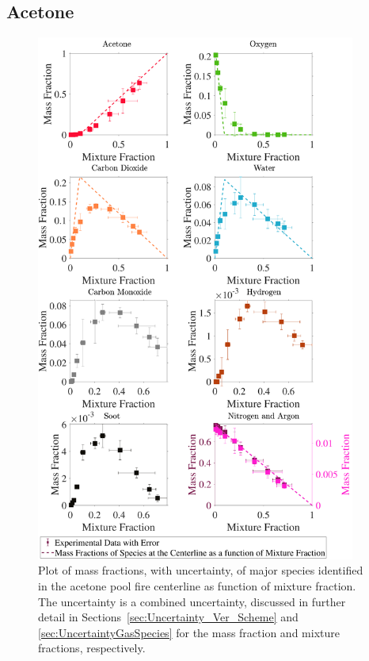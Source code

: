 \documentclass[12pt]{article}
\begin{document}
\subsection{Acetone}
\label{ssec:Acetone_ALL_Mix_Frac}
\begin{figure}[!h]
	\centering
\includegraphics[width=10.5cm,keepaspectratio]{Acetone_Mixture_Fraction_Major_Plot.pdf}
	\caption[Species mass fractions superimposed on acetone state relations]{Plot of mass fractions, with uncertainty, of major species identified in the acetone pool fire centerline as function of mixture fraction. The uncertainty is a combined uncertainty, discussed in further detail in Sections~\ref{sec:Uncertainty_Ver_Scheme} and \ref{sec:UncertaintyGasSpecies} for the mass fraction and mixture fractions, respectively.}
	\label{fig:Acetone_MIX_Frac_Major}
\end{figure}

\pagebreak
\end{document}

